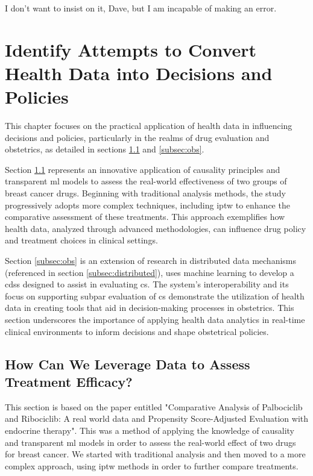 \begin{savequote}[85mm]
    I don’t want to insist on it, Dave, but I am incapable of making an error.
    \end{savequote}
    
\chapter{Identify Attempts to Convert Health Data into Decisions and Policies}\label{chap:goal3}
This chapter focuses on the practical application of health data in influencing decisions and policies, particularly in the realms of drug evaluation and obstetrics, as detailed in sections \ref{subsec:ipop} and \ref{subsec:obs}.

Section \ref{subsec:ipop} represents an innovative application of causality principles and transparent \ac{ml} models to assess the real-world effectiveness of two groups of breast cancer drugs. Beginning with traditional analysis methods, the study progressively adopts more complex techniques, including \ac{iptw} to enhance the comparative assessment of these treatments. This approach exemplifies how health data, analyzed through advanced methodologies, can influence drug policy and treatment choices in clinical settings.

Section \ref{subsec:obs} is an extension of research in distributed data mechanisms (referenced in section \ref{subsec:distributed}), uses machine learning to develop a \ac{cdss} designed to assist in evaluating \ac{cs}. The system's interoperability and its focus on supporting subpar evaluation of \ac{cs} demonstrate the utilization of health data in creating tools that aid in decision-making processes in obstetrics. This section underscores the importance of applying health data analytics in real-time clinical environments to inform decisions and shape obstetrical policies.



\section{How Can We Leverage Data to Assess Treatment Efficacy?}\label{subsec:ipop}
This section is based on the paper entitled "Comparative Analysis of Palbociclib and Ribociclib: A real world data and Propensity Score-Adjusted Evaluation with endocrine therapy". This was a method of applying the knowledge of causality and transparent \ac{ml} models in order to assess the real-world effect of two drugs for breast cancer. We started with traditional analysis and then moved to a more complex approach, using \ac{iptw} methods in order to further compare treatments.
    

